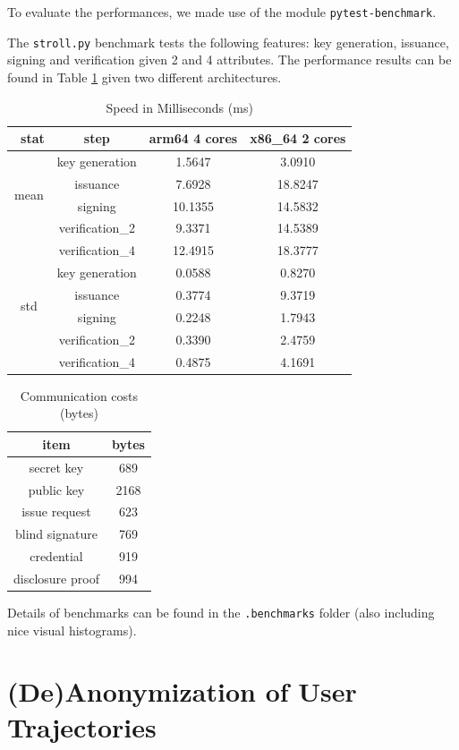 \documentclass[10pt,conference,compsocconf]{IEEEtran}
\begin{document}
To evaluate the performances, we made use of the module \texttt{pytest-benchmark}.

The \texttt{stroll.py} benchmark tests the following features: key generation, issuance, signing and verification given 2 and 4 attributes. The performance results can be found in Table \ref{tab:strollperf} given two different architectures. 


\begin{table}[h!]
\centering
\begin{tabular}{ |c|c|c|c| } 
\hline
\ stat & step & arm64 4 cores & x86\_64 2 cores\\
\hline
\hline
\multirow{4}{4em}{mean} & key generation & 1.5647 & 3.0910 \\ 
& issuance & 7.6928 & 18.8247 \\ 
& signing & 10.1355 & 14.5832 \\ 
& verification\_2 & 9.3371 & 14.5389 \\ 
& verification\_4 & 12.4915 & 18.3777 \\
\hline
\multirow{4}{4em}{std} & key generation & 0.0588 & 0.8270 \\ 
& issuance & 0.3774 & 9.3719 \\ 
& signing & 0.2248 & 1.7943 \\ 
& verification\_2 & 0.3390 & 2.4759 \\ 
& verification\_4 & 0.4875 & 4.1691 \\ 
\hline
\end{tabular}
\caption{\label{tab:strollperf}Speed in Milliseconds (ms) }
\end{table}


\begin{table}[h!]
\centering
\begin{tabular}{ |c|c| } 
\hline
item & bytes \\
\hline
\hline
secret key & 689 \\ 
public key & 2168 \\ 
issue request & 623 \\
blind signature & 769 \\ 
credential & 919 \\ 
disclosure proof & 994 \\ 
\hline
\end{tabular}
\caption{Communication costs (bytes)}
\end{table}
Details of benchmarks can be found in the \texttt{.benchmarks} folder (also including nice visual histograms).
\section{(De)Anonymization of User Trajectories}
\end{document}
